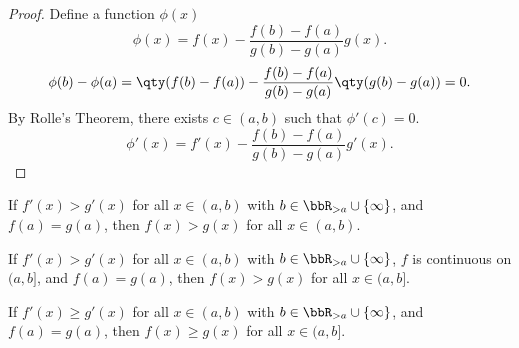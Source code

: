 \documentclass[a4paper,12pt]{report}
\begin{document}
\begin{itemize}
\begin{itemize}
\begin{proof}
    Define a function $\phi(x)$
    \[\phi(x)=f(x)-\frac{f(b)-f(a)}{g(b)-g(a)}g(x).\]
    \[\phi(b)-\phi(a)=\qty(f(b)-f(a))-\frac{f(b)-f(a)}{g(b)-g(a)}\qty(g(b)-g(a))=0.\]
    By Rolle's Theorem, there exists $c\in (a,b)$ such that $\phi'(c)=0$.
    \[\phi'(x)=f'(x)-\frac{f(b)-f(a)}{g(b)-g(a)}g'(x).\]
\end{proof}
If $f'(x)>g'(x)$ for all $x\in (a,b)$ with $b\in\bbR_{>a}\cup\{\infty\}$, and $f(a)=g(a)$, then $f(x)>g(x)$ for all $x\in(a,b)$.

If $f'(x)>g'(x)$ for all $x\in (a,b)$ with $b\in\bbR_{>a}\cup\{\infty\}$, $f$ is continuous on $(a,b]$, and $f(a)=g(a)$, then $f(x)>g(x)$ for all $x\in(a,b]$.

If $f'(x)\geq g'(x)$ for all $x\in (a,b)$ with $b\in\bbR_{>a}\cup\{\infty\}$, and $f(a)=g(a)$, then $f(x)\geq g(x)$ for all $x\in(a,b]$.


\end{itemize}
\end{itemize}
\end{document}
